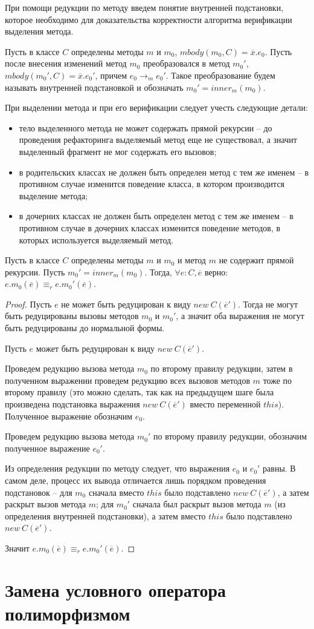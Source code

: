 При помощи редукции по методу введем понятие внутренней подстановки, которое необходимо для доказательства корректности алгоритма верификации выделения метода.
\begin{definition}
Пусть в классе $C$ определены методы $m$ и $m_0$, $mbody(m_0, C) = \overline{x}.e_0$.
Пусть после внесения изменений метод $m_0$ преобразовался в метод $m_0'$, $mbody(m_0', C) = \overline{x}.e_0'$, причем $e_0 \rightarrow_m e_0'$.
Такое преобразование будем называть внутренней подстановкой и обозначать $m_0' = inner_m(m_0)$.
\end{definition}

При выделении метода и при его верификации следует учесть следующие детали:
\begin{itemize}
    \item тело выделенного метода не может содержать прямой рекурсии -- до проведения рефакторинга выделяемый метод еще не существовал, а значит выделенный фрагмент не мог содержать его вызовов;
    \item в родительских классах не должен быть определен метод с тем же именем -- в противном случае изменится поведение класса, в котором производится выделение метода;
    \item в дочерних классах не должен быть определен метод с тем же именем -- в противном случае в дочерних классах изменится поведение методов, в которых используется выделяемый метод.
\end{itemize}

\begin{theorem}
Пусть в классе $C$ определены методы $m$ и $m_0$ и метод $m$ не содержит прямой рекурсии. Пусть $m_0' = inner_m(m_0)$.
Тогда, $\forall e : C, \overline{e}$ верно: $e.m_0(\overline{e}) \equiv_r e.m_0'(\overline{e})$.
\end{theorem}
\begin{proof}
Пусть $e$ не может быть редуцирован к виду $new\ C(\overline{e}')$. Тогда не могут быть редуцированы вызовы методов $m_0$ и $m_0'$, а значит оба выражения не могут быть редуцированы до нормальной формы.

Пусть $e$ может быть редуцирован к виду $new\ C(\overline{e}')$.

Проведем редукцию вызова метода $m_0$ по второму правилу редукции, затем в полученном выражении проведем редукцию всех вызовов методов $m$ тоже по второму правилу
(это можно сделать, так как на предыдущем шаге была произведена подстановка выражения $new\ C(\overline{e}')$ вместо переменной $this$). Полученное выражение обозначим $e_0$.

Проведем редукцию вызова метода $m_0'$ по второму правилу редукции, обозначим полученное выражение $e_0'$.

Из определения редукции по методу следует, что выражения $e_0$ и $e_0'$ равны.
В самом деле, процесс их вывода отличается лишь порядком проведения подстановок -- для $m_0$ сначала вместо $this$ было подставлено $new\ C(\overline{e}')$, а затем раскрыт вызов метода $m$;
для $m_0'$ сначала был раскрыт вызов метода $m$ (из определения внутренней подстановки), а затем вместо $this$ было подставлено $new\ C(\overline{e}')$.

Значит $e.m_0(\overline{e}) \equiv_r e.m_0'(\overline{e})$.
\end{proof}
\section{Замена условного оператора полиморфизмом}